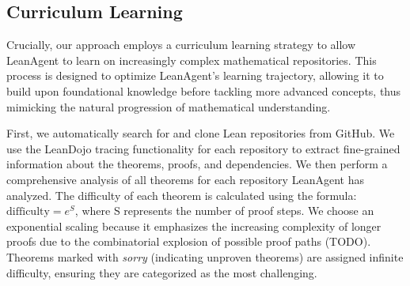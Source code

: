 \documentclass{article} %
\begin{document}





\subsection{Curriculum Learning}

Crucially, our approach employs a curriculum learning strategy to allow LeanAgent to learn on increasingly complex mathematical repositories. This process is designed to optimize LeanAgent's learning trajectory, allowing it to build upon foundational knowledge before tackling more advanced concepts, thus mimicking the natural progression of mathematical understanding.

First, we automatically search for and clone Lean repositories from GitHub. We use the LeanDojo tracing functionality for each repository to extract fine-grained information about the theorems, proofs, and dependencies. We then perform a comprehensive analysis of all theorems for each repository LeanAgent has analyzed. The difficulty of each theorem is calculated using the formula: $\text{difficulty} = e^{S}$, where S represents the number of proof steps. We choose an exponential scaling because it emphasizes the increasing complexity of longer proofs due to the combinatorial explosion of possible proof paths (TODO). Theorems marked with \textit{sorry} (indicating unproven theorems) are assigned infinite difficulty, ensuring they are categorized as the most challenging.
\end{document}
